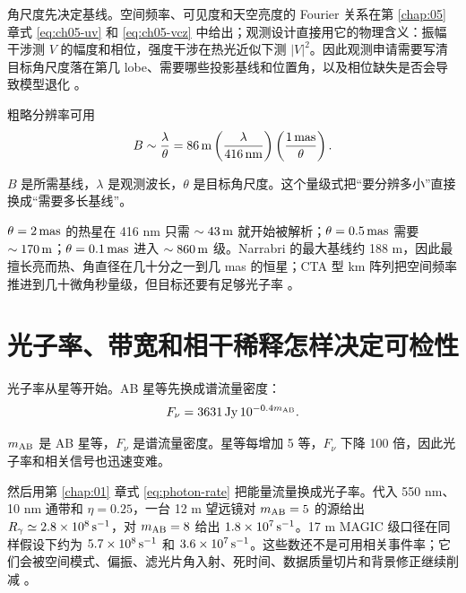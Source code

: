 角尺度先决定基线。空间频率、可见度和天空亮度的 Fourier 关系在第 \ref{chap:05} 章式 \eqref{eq:ch05-uv} 和 \eqref{eq:ch05-vcz} 中给出；观测设计直接用它的物理含义：振幅干涉测 \(V\) 的幅度和相位，强度干涉在热光近似下测 \(|V|^2\)。因此观测申请需要写清目标角尺度落在第几 lobe、需要哪些投影基线和位置角，以及相位缺失是否会导致模型退化 \citep{2003RPPh...66..789M,2009A&A...507.1719F,2012NewAR..56..143D,2014MNRAS.437..798M,2022MNRAS.512.1722K}。

粗略分辨率可用
\begin{equation}
  B
  \sim
  \frac{\lambda}{\theta}
  =
  86\,{\rm m}
  \left(\frac{\lambda}{416\,{\rm nm}}\right)
  \left(\frac{1\,{\rm mas}}{\theta}\right).
  \label{eq:ch18-baseline-scale}
\end{equation}
\begin{formulaexplain}[公式 (18.2) 解读]
\(B\) 是所需基线，\(\lambda\) 是观测波长，\(\theta\) 是目标角尺度。这个量级式把“要分辨多小”直接换成“需要多长基线”。
\end{formulaexplain}
\(\theta=2\,{\rm mas}\) 的热星在 416 nm 只需 \(\sim43\,{\rm m}\) 就开始被解析；\(\theta=0.5\,{\rm mas}\) 需要 \(\sim170\,{\rm m}\)；\(\theta=0.1\,{\rm mas}\) 进入 \(\sim860\,{\rm m}\) 级。Narrabri 的最大基线约 188 m，因此最擅长亮而热、角直径在几十分之一到几 mas 的恒星；CTA 型 km 阵列把空间频率推进到几十微角秒量级，但目标还要有足够光子率 \citep{1974MNRAS.167..121H,2006ApJ...649..399L,2010SPIE.7734E..1TJ,2013APh....43..331D}。

\section{光子率、带宽和相干稀释怎样决定可检性}

光子率从星等开始。AB 星等先换成谱流量密度：
\begin{equation}
  F_\nu=3631\,{\rm Jy}\,10^{-0.4m_{\rm AB}}.
  \label{eq:ch18-ab-flux}
\end{equation}
\begin{formulaexplain}[公式 (18.3) 解读]
\(m_{\rm AB}\) 是 AB 星等，\(F_\nu\) 是谱流量密度。星等每增加 5 等，\(F_\nu\) 下降 100 倍，因此光子率和相关信号也迅速变难。
\end{formulaexplain}
然后用第 \ref{chap:01} 章式 \eqref{eq:photon-rate} 把能量流量换成光子率。代入 550 nm、10 nm 通带和 \(\eta=0.25\)，一台 12 m 望远镜对 \(m_{\rm AB}=5\) 的源给出 \(R_\gamma\simeq2.8\times10^8\,{\rm s^{-1}}\)，对 \(m_{\rm AB}=8\) 给出 \(1.8\times10^7\,{\rm s^{-1}}\)。17 m MAGIC 级口径在同样假设下约为 \(5.7\times10^8\,{\rm s^{-1}}\) 和 \(3.6\times10^7\,{\rm s^{-1}}\)。这些数还不是可用相关事件率；它们会被空间模式、偏振、滤光片角入射、死时间、数据质量切片和背景修正继续削减 \citep{2006ApJ...649..399L,2020MNRAS.491.1540A,2021MNRAS.506.1585Z,2024MNRAS.529.4387A}。

